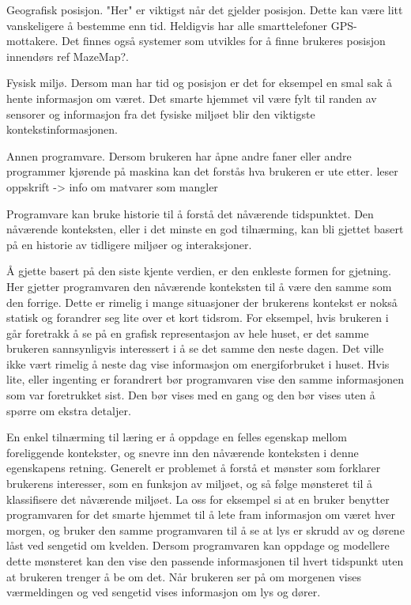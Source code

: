 Geografisk posisjon. "Her" er viktigst når det gjelder posisjon. Dette kan være litt vanskeligere å bestemme enn tid. Heldigvis har alle smarttelefoner GPS-mottakere. Det finnes også systemer som utvikles for å finne brukeres posisjon innendørs {\color{red}ref MazeMap?}.

Fysisk miljø. Dersom man har tid og posisjon er det for eksempel en smal sak å hente informasjon om været. Det smarte hjemmet vil være fylt til randen av sensorer og informasjon fra det fysiske miljøet blir den viktigste kontekstinformasjonen.

Annen programvare. Dersom brukeren har åpne andre faner eller andre programmer kjørende på maskina kan det forstås hva brukeren er ute etter. {\color{red}leser oppskrift -> info om matvarer som mangler}

Programvare kan bruke historie til å forstå det nåværende tidspunktet. Den nåværende konteksten, eller i det minste en god tilnærming, kan bli gjettet basert på en historie av tidligere miljøer og interaksjoner.

Å gjette basert på den siste kjente verdien, er den enkleste formen for gjetning. Her gjetter programvaren den nåværende konteksten til å være den samme som den forrige. Dette er rimelig i mange situasjoner der brukerens kontekst er nokså statisk og forandrer seg lite over et kort tidsrom. For eksempel, hvis brukeren i går foretrakk å se på en grafisk representasjon av hele huset, er det samme brukeren sannsynligvis interessert i å se det samme den neste dagen. Det ville ikke vært rimelig å neste dag vise informasjon om energiforbruket i huset. Hvis lite, eller ingenting er forandrert bør programvaren vise den samme informasjonen som var foretrukket sist. Den bør vises med en gang og den bør vises uten å spørre om ekstra detaljer.

En enkel tilnærming til læring er å oppdage en felles egenskap mellom foreliggende kontekster, og snevre inn den nåværende konteksten i denne egenskapens retning. Generelt er problemet å forstå et mønster som forklarer brukerens interesser, som en funksjon av miljøet, og så følge mønsteret til å klassifisere det nåværende miljøet. La oss for eksempel si at en bruker benytter programvaren for det smarte hjemmet til å lete fram informasjon om været hver morgen, og bruker den samme programvaren til å se at lys er skrudd av og dørene låst ved sengetid om kvelden. Dersom programvaren kan oppdage og modellere dette mønsteret kan den vise den passende informasjonen til hvert tidspunkt uten at brukeren trenger å be om det. Når brukeren ser på om morgenen vises værmeldingen og ved sengetid vises informasjon om lys og dører.

